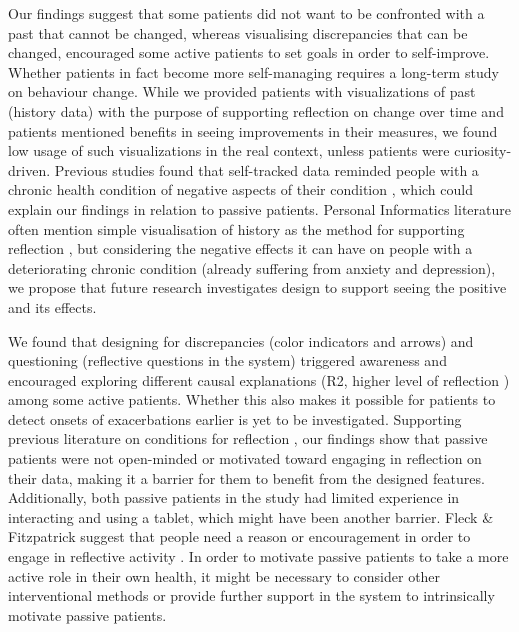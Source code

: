 Our findings suggest that some patients did not want to be confronted with a past that cannot be changed, whereas visualising discrepancies that can be changed, encouraged some active patients to set goals in order to self-improve. Whether patients in fact become more self-managing requires a long-term study on behaviour change. While we provided patients with visualizations of past (history data) with the purpose of supporting reflection on change over time \cite{Rivera, Cuttone} and patients mentioned benefits in seeing improvements in their measures, we found low usage of such visualizations in the real context, unless patients were curiosity-driven. Previous studies found that self-tracked data reminded people with a chronic health condition of negative aspects of their condition \cite{Li2010, Ancker2015}, which could explain our findings in relation to passive patients. Personal Informatics literature often mention simple visualisation of history as the method for supporting reflection \cite{Li2011, MacLeod2014, Rivera}, but considering the negative effects it can have on people with a deteriorating chronic condition (already suffering from anxiety and depression), we propose that future research investigates design to support seeing the positive and its effects. 

We found that designing for discrepancies (color indicators and arrows) and questioning (reflective questions in the system) triggered awareness and encouraged exploring different causal explanations (R2, higher level of reflection \cite{Fleck}) among some active patients. Whether this also makes it possible for patients to detect onsets of exacerbations earlier is yet to be investigated. Supporting previous literature on conditions for reflection \cite{Atkins, Rogers}, our findings show that passive patients were not open-minded or motivated toward engaging in reflection on their data, making it a barrier for them to benefit from the designed features. Additionally, both passive patients in the study had limited experience in interacting and using a tablet, which might have been another barrier. Fleck \& Fitzpatrick suggest that people need a reason or encouragement in order to engage in reflective activity \cite{Fleck}. In order to motivate passive patients to take a more active role in their own health, it might be necessary to consider other interventional methods or provide further support in the system to intrinsically motivate passive patients. 

